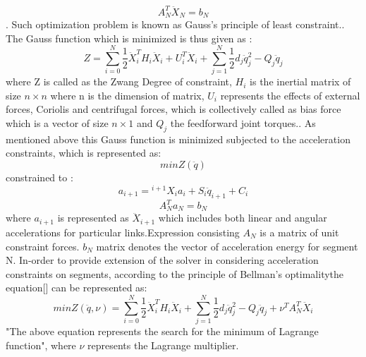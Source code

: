 $$A_{N}^{T}\ddot{X}_{N} = b_{N}$$.
Such optimization problem is known as Gauss’s principle of least constraint.\cite{shakhimardanov2015}. The Gauss function which is minimized is thus given as \cite{vereshchagin1989modeling}:
$$ Z = \sum_{i=0}^{N}\frac{1}{2}\ddot{X}_{i}^{T}H_{i}\ddot{X}_{i} + U^{T}_{i}\ddot{X}_{i}+ \sum_{j=1}^{N}\frac{1}{2}d_{j}\ddot{q}_{j}^{2} - Q_{j}\ddot{q}_{j}$$
where Z is called as the Zwang Degree of constraint, $H_{i}$ is the inertial matrix of size $n \times n $ where n is the dimension of matrix, $U_{i}$ represents the effects of external forces, Coriolis and centrifugal forces, which is collectively called as bias force which is a vector of size $n\times 1$ and $Q_{j}$ the feedforward joint torques.\cite{vereshchagin1989modeling}. As mentioned above this Gauss function is minimized subjected to the acceleration constraints, which is represented as:
$$min  Z(\ddot{q}) $$
constrained to : $$ a_{i+1} = {^{i+1}X_{i}} a_{i} + S_{i}\ddot{q}_{i+1}+ C_{i}$$
$$A_{N}^{T}a_{N} = b_{N}$$
where $a_{i+1}$ is represented as $\ddot{X}_{i+1}$ which includes both linear and angular accelerations for particular links.Expression consisting $A_{N}$ is a matrix of unit constraint forces. $b_{N}$ matrix denotes the vector of acceleration energy for segment N. In-order to provide extension of the solver in considering acceleration constraints on segments, according to the principle of Bellman's optimality\cite{bellman2013dynamic}the equation[] can be represented as:
$$min  Z(\ddot{q},\nu)  = \sum_{i=0}^{N}\frac{1}{2}\ddot{X}_{i}^{T}H_{i}\ddot{X}_{i} +  \sum_{j=1}^{N}\frac{1}{2}d_{j}\ddot{q}_{j}^{2} - Q_{j}\ddot{q}_{j} + \nu^{T}A_{N}^{T}\ddot{X}_{i}$$
"The above equation represents the search for the minimum of Lagrange function"\cite{shakhimardanov2015}\cite{lagrange1853mecanique}, where $\nu$ represents the Lagrange multiplier.
\newpage
\par 
